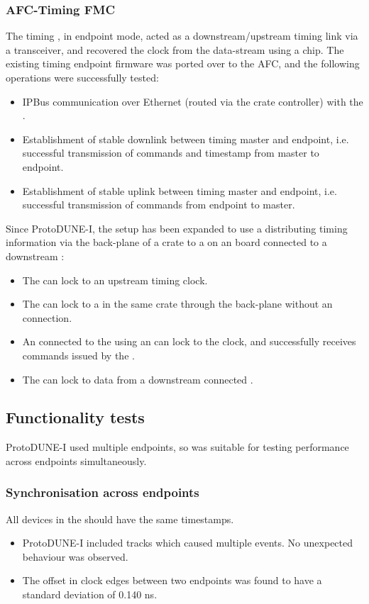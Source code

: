 \documentclass{dune}
\begin{document}
\subsubsection{AFC-Timing FMC}
The timing , in endpoint mode, acted as a downstream/upstream timing link via a  transceiver, and recovered the clock from the data-stream using a  chip.
The existing timing endpoint firmware was ported over to the AFC, and the following operations were successfully tested:
\begin{itemize}
    \item IPBus communication over Ethernet (routed via the crate controller) with the  .
    \item Establishment of stable downlink between timing master and endpoint, i.e. successful transmission of commands and timestamp from master to endpoint.
    \item Establishment of stable uplink between timing master and endpoint, i.e. successful transmission of commands from endpoint to master.
\end{itemize}
Since ProtoDUNE-I, the setup has been expanded to use a  distributing timing information via the back-plane of a  crate to a  on an  board connected to a downstream :
\begin{itemize}
    \item The  can lock to an upstream timing clock.
    \item The  can lock to a  in the same crate through the back-plane without an  connection.
    \item An  connected to the  using an  can lock to the clock, and successfully receives commands issued by the .
    \item The  can lock to data from a downstream connected .
\end{itemize}

\subsection{Functionality tests}
ProtoDUNE-I used multiple endpoints, so was suitable for testing performance across endpoints simultaneously.
\subsubsection{Synchronisation across endpoints}
All devices in the  should have the same timestamps.
\begin{itemize}
  \item ProtoDUNE-I included tracks which caused multiple  events.
    No unexpected behaviour was observed.
  \item The offset in clock edges between two endpoints was found to have a standard deviation of 0.140 ns.
\end{itemize}
\end{document}

